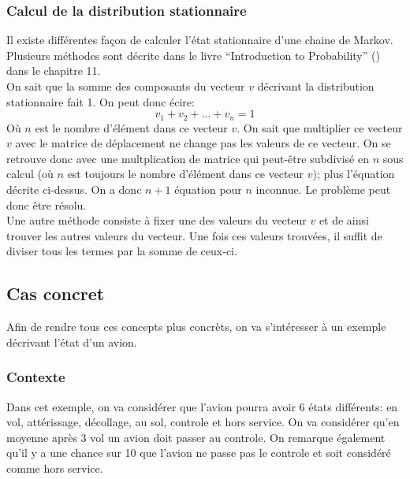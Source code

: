 \documentclass[letterpaper]{article}
\begin{document}
    \subsubsection{Calcul de la distribution stationnaire}
      \label{etat_stationnaire}
      Il existe différentes façon de calculer l'état stationnaire d'une chaine de Markov.
      Plusieurs méthodes sont décrite dans le livre ``Introduction to Probability'' (\citep{IP}) 
      dans le chapitre 11.\\
      On sait que la somme des composants du vecteur $v$ décrivant la distribution stationnaire 
      fait 1.  On peut donc écire:
      $$v_1 + v_2 + ... + v_n = 1$$
      Où $n$ est le nombre d'élément dans ce vecteur $v$.  On sait que multiplier ce vecteur $v$
      avec le matrice de déplacement ne change pas les valeurs de ce vecteur.  On se retrouve donc
      avec une multplication de matrice qui peut-être subdivisé en $n$ sous calcul (où $n$ est 
      toujours le nombre d'élément dans ce vecteur $v$); plus l'équation décrite ci-dessus.  On a 
      donc $n+1$ équation pour $n$ inconnue.  Le problème peut donc être résolu.\\
      Une autre méthode consiste à fixer une des valeurs du vecteur $v$ et de ainsi trouver les 
      autres valeurs du vecteur.  Une fois ces valeurs trouvées, il suffit de diviser tous les 
      termes par la somme de ceux-ci.
  
  \subsection{Cas concret}
    Afin de rendre tous ces concepts plus concrèts, on va s'intéresser à un exemple décrivant
    l'état d'un avion.
    
    \subsubsection{Contexte}
      Dans cet exemple, on va considérer que l'avion pourra avoir 6 états différents: en vol,
      attérissage, décollage, au sol, controle et hors service.  On va considérer qu'en moyenne
      après 3 vol un avion doit passer au controle.  On remarque également qu'il y a une chance
      sur 10 que l'avion ne passe pas le controle et soit considéré comme hors service.
      
\end{document}
